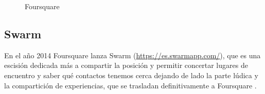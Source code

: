 \begin{figure}[h!btp]
	\begin{adjustbox}{minipage=\linewidth, fbox}
		\centering
		\hspace{10mm}
	\end{adjustbox}
\caption{Foursquare}
	\label{fig:foursquare}
\end{figure}

\subsection{Swarm}
En el año 2014 Foursquare lanza Swarm (\url{https://es.swarmapp.com/}), que es una escisión dedicada más a compartir la posición y permitir concertar lugares de encuentro y saber qué contactos tenemos cerca dejando de lado la parte lúdica y la compartición de experiencias, que se trasladan definitivamente a Foursquare \cite{Buzz14}.

